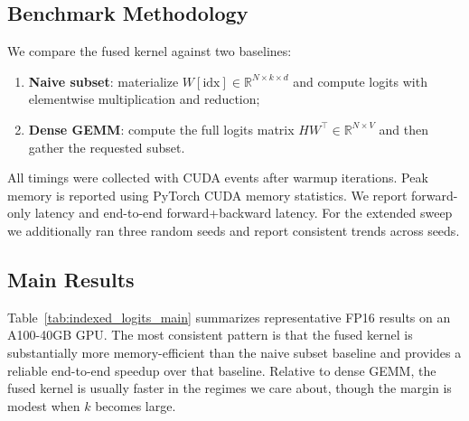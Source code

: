 \subsection{Benchmark Methodology}

We compare the fused kernel against two baselines:
\begin{enumerate}
\item \textbf{Naive subset}: materialize $W[\mathrm{idx}] \in \mathbb{R}^{N \times k \times d}$ and compute logits with elementwise multiplication and reduction;
\item \textbf{Dense GEMM}: compute the full logits matrix $H W^\top \in \mathbb{R}^{N \times V}$ and then gather the requested subset.
\end{enumerate}

All timings were collected with CUDA events after warmup iterations. Peak memory is reported using PyTorch CUDA memory statistics. We report forward-only latency and end-to-end forward+backward latency. For the extended sweep we additionally ran three random seeds and report consistent trends across seeds.

\subsection{Main Results}

Table~\ref{tab:indexed_logits_main} summarizes representative FP16 results on an A100-40GB GPU. The most consistent pattern is that the fused kernel is substantially more memory-efficient than the naive subset baseline and provides a reliable end-to-end speedup over that baseline. Relative to dense GEMM, the fused kernel is usually faster in the regimes we care about, though the margin is modest when $k$ becomes large.

